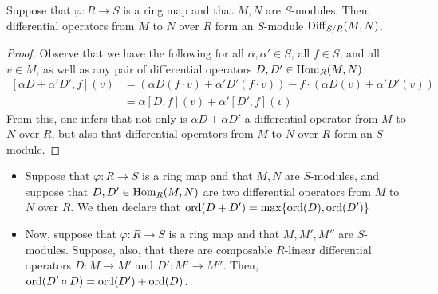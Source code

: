            \begin{proposition} \label{prop: linear_combinations_of_differential_operators}
                Suppose that $\varphi:  R \to S$ is a ring map and that $M, N$ are $S$-modules. Then, differential operators from $M$ to $N$ over $R$ form an $S$-module $\mathrm{Diff}_{S/R}(M, N)$.
            \end{proposition}
                \begin{proof}
                    Observe that we have the following for all $\alpha, \alpha' \in S$, all $f \in S$, and all $v \in M$, as well as any pair of differential operators $D, D' \in \mathrm{Hom}_R(M, N)$:
                        $$
                            \begin{aligned}
                                    [\alpha D + \alpha' D', f](v) & = (\alpha D(f \cdot v) + \alpha' D'(f \cdot v)) - f \cdot (\alpha D(v) + \alpha' D'(v))
                                    \\
                                    & = \alpha [D, f](v) + \alpha' [D', f](v)
                                \end{aligned}
                            $$
                    From this, one infers that not only is $\alpha D + \alpha D'$ a differential operator from $M$ to $N$ over $R$, but also that differential operators from $M$ to $N$ over $R$ form an $S$-module.
                \end{proof}
            \begin{convention} \label{conv: orders_of_differential operators}
                \noindent
                \begin{itemize}
                    \item Suppose that $\varphi:  R \to S$ is a ring map and that $M, N$ are $S$-modules, and suppose that $D, D' \in \mathrm{Hom}_R(M, N)$ are two differential operators from $M$ to $N$ over $R$. We then declare that $\operatorname{ord}(D + D') = \max\{\operatorname{ord}(D), \operatorname{ord}(D')\}$
                    \item Now, suppose that $\varphi:  R \to S$ is a ring map and that $M, M', M''$ are $S$-modules. Suppose, also, that there are composable $R$-linear differential operators $D: M \to M'$ and $D': M' \to M''$. Then, $\operatorname{ord}(D' \circ D) = \operatorname{ord}(D') + \operatorname{ord}(D)$.
                \end{itemize}
            \end{convention}
